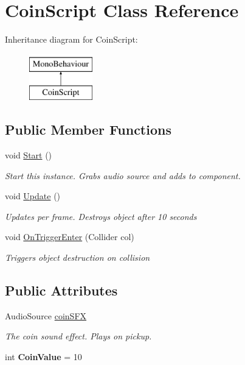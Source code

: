 \hypertarget{classCoinScript}{\section{Coin\-Script Class Reference}
\label{classCoinScript}
}
Inheritance diagram for Coin\-Script\-:\begin{figure}[H]
\begin{center}
\leavevmode
\includegraphics[height=2.000000cm]{classCoinScript}
\end{center}
\end{figure}
\subsection*{Public Member Functions}
\begin{DoxyCompactItemize}
\item 
void \hyperlink{classCoinScript_ad9cdff800db09d06178e34430977421d}{Start} ()
\begin{DoxyCompactList}\small\item\em Start this instance. Grabs audio source and adds to component. \end{DoxyCompactList}\item 
void \hyperlink{classCoinScript_a1288ee0f5b05f7e039cc681d91231fcc}{Update} ()
\begin{DoxyCompactList}\small\item\em Updates per frame. Destroys object after 10 seconds \end{DoxyCompactList}\item 
void \hyperlink{classCoinScript_a76037ba9ee74b1fce9d15015c6d1072a}{On\-Trigger\-Enter} (Collider col)
\begin{DoxyCompactList}\small\item\em Triggers object destruction on collision \end{DoxyCompactList}\end{DoxyCompactItemize}
\subsection*{Public Attributes}
\begin{DoxyCompactItemize}
\item 
Audio\-Source \hyperlink{classCoinScript_aacded91c375e9ac952edf1a1091ed3a1}{coin\-S\-F\-X}
\begin{DoxyCompactList}\small\item\em The coin sound effect. Plays on pickup. \end{DoxyCompactList}\item 
\hypertarget{classCoinScript_a1672491e696a0a39399fd2fe655b0f38}{int {\bfseries Coin\-Value} = 10}\label{classCoinScript_a1672491e696a0a39399fd2fe655b0f38}

\end{DoxyCompactItemize}


